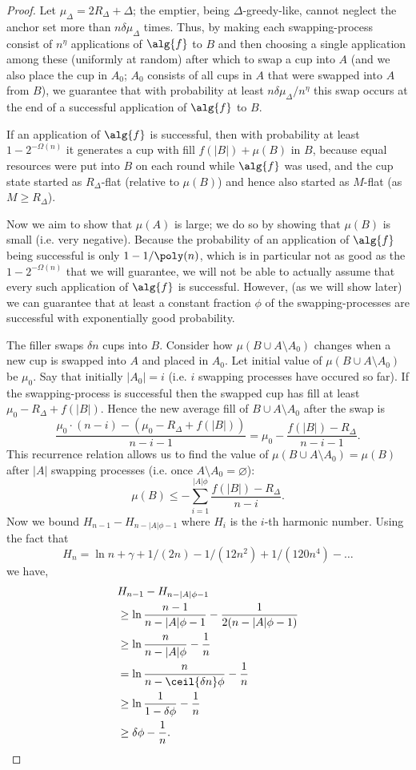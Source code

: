 \begin{proof}
  Let $\mu_\Delta = 2R_\Delta + \Delta$; the emptier, being
  $\Delta$-greedy-like, cannot neglect the anchor set more than
  $n\delta\mu_\Delta$ times. Thus, by making each
  swapping-process consist of $n^{\eta}$ applications of $\alg{f}$
  to $B$ and then choosing a single application among these
  (uniformly at random) after which to swap a cup into $A$ (and
  we also place the cup in $A_0$; $A_0$ consists of all cups in
  $A$ that were swapped into $A$ from $B$), we guarantee that
  with probability at least $n\delta\mu_\Delta/n^{\eta}$ this swap
  occurs at the end of a successful application of $\alg{f}$ to $B$. 

  If an application of $\alg{f}$ is successful, then with
  probability at least $1-2^{-\Omega(n)}$ it generates a cup with
  fill $f(|B|) + \mu(B)$ in $B$, because equal resources were put
  into $B$ on each round while $\alg{f}$ was used, and the cup
  state started as $R_\Delta$-flat (relative to $\mu(B)$) and
  hence also started as $M$-flat (as $M\ge R_\Delta$).

  Now we aim to show that $\mu(A)$ is large; we do so by showing
  that $\mu(B)$ is small (i.e. very negative). Because the
  probability of an application of $\alg{f}$ being successful is
  only $1-1/\poly(n)$, which is in particular not as good as the
  $1-2^{-\Omega(n)}$ that we will guarantee, we will not be able
  to actually assume that every such application of $\alg{f}$ is
  successful. However, (as we will show later) we can guarantee
  that at least a constant fraction $\phi$ of the
  swapping-processes are successful with
  exponentially good probability.

  The filler swaps $\delta n$ cups into $B$. 
  Consider how $\mu(B \cup A\setminus A_0)$ changes when a new
  cup is swapped into $A$ and placed in $A_0$. Let initial value
  of $\mu(B \cup A\setminus A_0)$ be $\mu_0$. Say that
  initially $|A_0| = i$ (i.e. $i$ swapping processes have occured
  so far). If the swapping-process is successful then the swapped cup has
  fill at least $\mu_0 - R_\Delta + f(|B|)$. Hence the new
  average fill of $B \cup A\setminus A_0$ after the swap is
  $$\frac{\mu_0\cdot (n-i) - (\mu_0 - R_\Delta + f(|B|))}{n-i-1} =
  \mu_0 - \frac{f(|B|) - R_\Delta}{n-i-1}.$$
  This recurrence relation allows us to find the value of
  $\mu(B \cup A\setminus A_0) = \mu(B)$ after $|A|$ swapping
  processes (i.e. once $A\setminus A_0 = \varnothing$):
  $$\mu(B) \le -\sum_{i=1}^{|A|\phi} \frac{f(|B|)-R_\Delta}{n-i}.$$
  Now we bound $H_{n-1} - H_{n-|A|\phi-1}$ where $H_i$ is the $i$-th harmonic number.
  Using the fact that 
  $$H_n = \ln n + \gamma + 1/(2n) - 1/(12 n^2) + 1/(120 n^4) - \ldots$$
  we have,
  \begin{align*}
    &H_{n-1} - H_{n-|A|\phi-1}\\
  &\ge \ln \frac{n-1}{n-|A|\phi-1} - \frac{1}{2(n-|A|\phi-1)}\\
  &\ge \ln \frac{n}{n-|A|\phi} - \frac{1}{n}\\
  &= \ln \frac{n}{n-\ceil{\delta n}\phi} - \frac{1}{n}\\
  &\ge \ln \frac{1}{1-\delta\phi} - \frac{1}{n}\\
  &\ge \delta\phi - \frac{1}{n}.
  \end{align*}


\end{proof}
